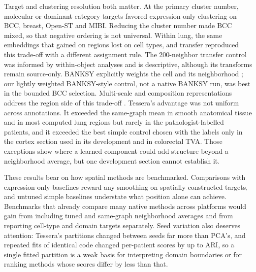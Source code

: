 Target and clustering resolution both matter. At the primary cluster number, molecular or dominant-category targets favored expression-only clustering on BCC, breast, Open-ST and MIBI. Reducing the cluster number made BCC mixed, so that negative ordering is not universal. Within lung, the same embeddings that gained on regions lost on cell types, and transfer reproduced this trade-off with a different assignment rule. The 200-neighbor transfer control was informed by within-object analyses and is descriptive, although its transforms remain source-only. BANKSY explicitly weights the cell and its neighborhood \citep{singhal2024banksy}; our lightly weighted BANKSY-style control, not a native BANKSY run, was best in the bounded BCC selection. Multi-scale and composition representations address the region side of this trade-off \citep{yuan2024mender,liang2026cellniche}. Tessera's advantage was not uniform across annotations. It exceeded the same-graph mean in smooth anatomical tissue and in most computed lung regions but rarely in the pathologist-labelled patients, and it exceeded the best simple control chosen with the labels only in the cortex section used in its development and in colorectal TVA. Those exceptions show where a learned component could add structure beyond a neighborhood average, but one development section cannot establish it.

These results bear on how spatial methods are benchmarked. Comparisons with expression-only baselines reward any smoothing on spatially constructed targets, and untuned simple baselines understate what position alone can achieve. Benchmarks that already compare many native methods across platforms \citep{yuan2024benchmark,kang2025nar,chen2025imeta} would gain from including tuned and same-graph neighborhood averages and from reporting cell-type and domain targets separately. Seed variation also deserves attention: Tessera's partitions changed between seeds far more than PCA's, and repeated fits of identical code changed per-patient scores by up to \RepMaxRange{} ARI, so a single fitted partition is a weak basis for interpreting domain boundaries or for ranking methods whose scores differ by less than that.


